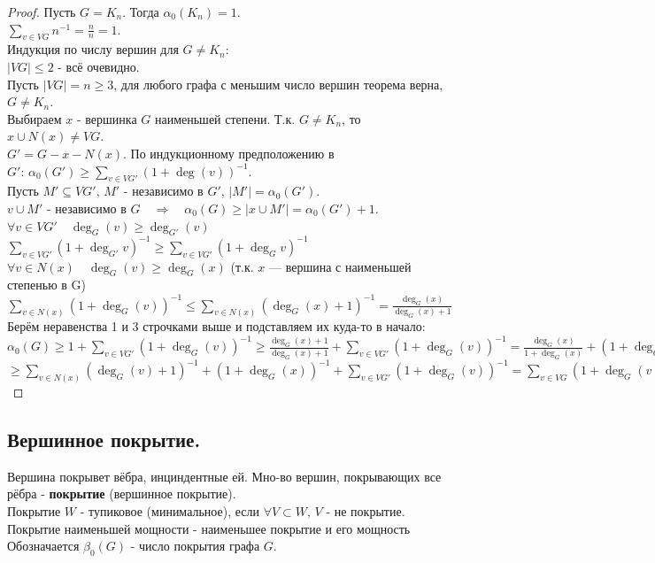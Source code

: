 \documentclass[12pt]{article}
\begin{document}
	\begin{proof}
		Пусть $G = K_n$. Тогда $\alpha_0(K_n) = 1$.\\
		$ \displaystyle \sum_{v \in VG} n^{-1} = \frac{n}{n} = 1$.\\
		Индукция по числу вершин для $G\ne K_n$:\\
		$|VG| \le 2$ - всё очевидно.\\
		Пусть $|VG| = n \ge 3$, для любого графа с меньшим число вершин теорема верна, $ G \ne K_n$.\\
		Выбираем $x$ - вершинка $G$ наименьшей степени. Т.к. $ G \ne K_n$, то $x \cup N(x) \ne VG$.\\
		$G' = G - x - N(x)$. По индукционному предположению в $ \displaystyle G': \, \alpha_0(G') \ge \sum_{v \in VG'} (1+ \operatorname{deg}(v))^{-1}$.\\
		Пусть $M' \subseteq VG', \, M'$ - независимо в $G'$, $|M'| = \alpha_0(G')$.\\
		$v \cup M'$ - независимо в $G \quad  \Rightarrow  \quad \alpha_0(G) \ge |x \cup M'| = \alpha_0(G')+1$.\\
		$\forall v \in VG' \quad  \operatorname{deg}_G(v) \ge  \operatorname{deg}_{G'}(v)$\\
		$ \displaystyle \sum_{v \in VG'} (1+ \operatorname{deg}_{G'} v)^{-1} \ge\sum_{v \in VG'} (1+ \operatorname{deg}_{G} v)^{-1}$\\
		$\forall v \in N(x) \quad  \operatorname{deg}_G(v) \ge  \operatorname{deg}_G(x)$ (т.к. $x$ — вершина с наименьшей степенью в G)\\
		$ \displaystyle \sum_{v \in N(x)} (1+ \operatorname{deg}_G(v))^{-1} \le \sum_{v \in N(x)}( \operatorname{deg}_G(x)+1)^{-1} = \frac{ \operatorname{deg}_G(x)}{\operatorname{deg}_G(x)+1}$\\
		Берём неравенства 1 и 3 строчками выше и подставляем их куда-то в начало:\\
		$ \displaystyle \alpha_0(G) \ge 1 + \sum_{v \in VG'} (1+ \operatorname{deg}_G(v))^{-1} \ge \frac{ \operatorname{deg}_G(x)+1}{\operatorname{deg}_G(x)+1}+\sum_{v\in VG'}(1+ \operatorname{deg}_G(v))^{-1} = \frac{ \operatorname{deg}_G(x)}{1+\operatorname{deg}_G(x)} + (1+ \operatorname{deg}_G(x))^{-1} + \sum_{v \in VG'} (1+ \operatorname{deg}_G(v))^{-1}$
		$ \displaystyle \ge \sum_{v \in N(x)}( \operatorname{deg}_G(v)+1)^{-1} + (1+ \operatorname{deg}_G(x))^{-1} + \sum_{v \in VG'}(1 +  \operatorname{deg}_G(v))^{-1} = \sum_{v\in VG}(1+ \operatorname{deg}_G(v))^{-1}$
	\end{proof}
\subsection{Вершинное покрытие.}
	Вершина покрывет вёбра, инциндентные ей. Мно-во вершин, покрывающих все рёбра - \textbf{покрытие} (вершинное покрытие).\\
	Покрытие $W$ - тупиковое (минимальное), если $\forall V \subset W, \, V$ - не покрытие. Покрытие наименьшей мощности - наименьшее покрытие и его мощность
	Обозначается $\beta_0(G)$ - число покрытия графа $G$.
\end{document}

